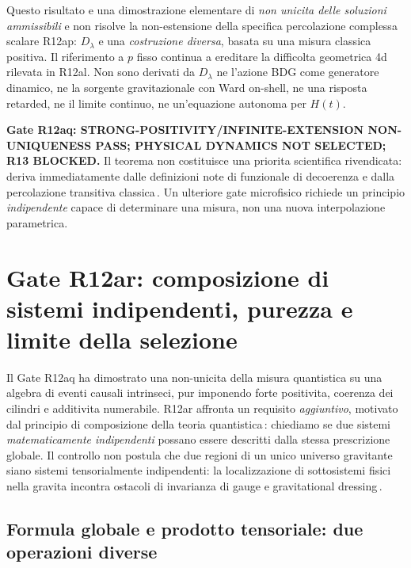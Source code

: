 \documentclass[11pt,a4paper]{article}
\begin{document}
Questo risultato e una dimostrazione elementare di \emph{non unicita delle
soluzioni ammissibili} e non risolve la non-estensione della specifica
percolazione complessa scalare R12ap: $D_\lambda$ e una \emph{costruzione
diversa}, basata su una misura classica positiva. Il riferimento a $p$ fisso
continua a ereditare la difficolta geometrica 4d rilevata in R12al. Non sono
derivati da $D_\lambda$ ne l'azione BDG come generatore dinamico, ne la
sorgente gravitazionale con Ward on-shell, ne una risposta retarded, ne il
limite continuo, ne un'equazione autonoma per $H(t)$.

\noindent\textbf{Gate R12aq: STRONG-POSITIVITY/INFINITE-EXTENSION NON-UNIQUENESS
PASS; PHYSICAL DYNAMICS NOT SELECTED; R13 BLOCKED.}
Il teorema non costituisce una priorita scientifica rivendicata: deriva
immediatamente dalle definizioni note di funzionale di decoerenza e dalla
percolazione transitiva classica\,\cite{DowkerWilkes2020,Surya2019Review}.
Un ulteriore gate microfisico richiede un principio \emph{indipendente}
capace di determinare una misura, non una nuova interpolazione parametrica.


\section{Gate R12ar: composizione di sistemi indipendenti, purezza e limite della selezione}

Il Gate R12aq ha dimostrato una non-unicita della misura quantistica su
una algebra di eventi causali intrinseci, pur imponendo forte positivita,
coerenza dei cilindri e additivita numerabile. R12ar affronta un requisito
\emph{aggiuntivo}, motivato dal principio di composizione della teoria
quantistica\,\cite{DowkerWilkes2020}: chiediamo se due sistemi
\emph{matematicamente indipendenti} possano essere descritti dalla stessa
prescrizione globale. Il controllo non postula che due regioni di un unico
universo gravitante siano sistemi tensorialmente indipendenti: la
localizzazione di sottosistemi fisici nella gravita incontra ostacoli di
invarianza di gauge e gravitational dressing\,\cite{DonnellyGiddings2016,DonnellyFreidel2016}.

\subsection{Formula globale e prodotto tensoriale: due operazioni diverse}
\end{document}
